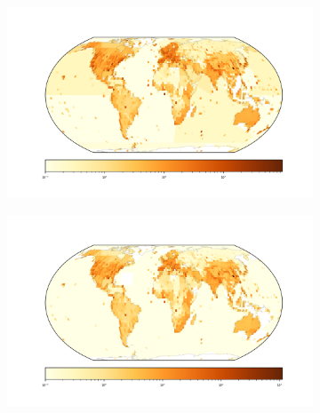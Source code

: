 \documentclass{article}
\begin{document}
\begin{figure}
	\begin{subfigure}{.5\textwidth}
		\includegraphics[width=\linewidth]{../plots/maps/gridcells_studies_temp_2_5_global.png}
	\end{subfigure}
	\begin{subfigure}{.5\textwidth}
		\includegraphics[width=\linewidth]{../plots/maps/gridcells_studies_precip_2_5_global.png}
	\end{subfigure}	
	
	

\end{figure}
\end{document}
